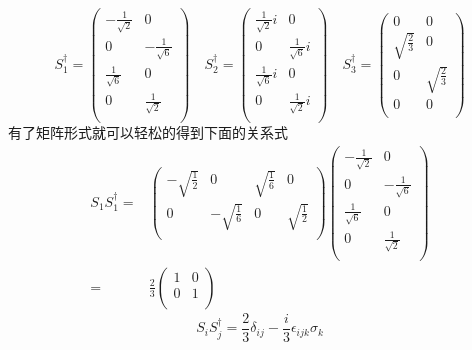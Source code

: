 \begin{equation}
	S_{1}^{\dagger}=
	\begin{pmatrix}
		-\frac{1}{\sqrt{2}} & 0 \\
		0 & -\frac{1}{\sqrt{6}} \\
		\frac{1}{\sqrt{6}} & 0 \\
		0 & \frac{1}{\sqrt{2}} \\
	\end{pmatrix}\quad
	S_{2}^{\dagger}=
	\begin{pmatrix}
		\frac{1}{\sqrt{2}}i & 0 \\
		0 & \frac{1}{\sqrt{6}}i \\
		\frac{1}{\sqrt{6}}i &0  \\
		0 & \frac{1}{\sqrt{2}}i \\
	\end{pmatrix}\quad
	S_{3}^{\dagger}=
	\begin{pmatrix}
		0 & 0 \\
		\sqrt{\frac{2}{3}} & 0 \\
		0 & \sqrt{\frac{2}{3}} \\
		0 & 0 \\
	\end{pmatrix}
\end{equation}
有了矩阵形式就可以轻松的得到下面的关系式
\begin{align*}
	S_{1}S_{1}^{\dagger}=&
	\begin{pmatrix}
		-\sqrt{\frac{1}{2}} & 0 & \sqrt{\frac{1}{6}} & 0 \\
		0 & -\sqrt{\frac{1}{6}} & 0 & \sqrt{\frac{1}{2}} \\
	\end{pmatrix}
	\begin{pmatrix}
		-\frac{1}{\sqrt{2}} & 0 \\
		0 & -\frac{1}{\sqrt{6}} \\
		\frac{1}{\sqrt{6}} & 0 \\
		0 & \frac{1}{\sqrt{2}} \\
	\end{pmatrix}\\
	=&\frac{2}{3}
	\begin{pmatrix}
		1 & 0 \\
		0 & 1 \\
	\end{pmatrix}
\end{align*}
\begin{equation}
	S_{i}S_{j}^{\dagger}=\frac{2}{3}\delta_{ij}-\frac{i}{3}\epsilon_{ijk}\sigma_{k}
\end{equation}

